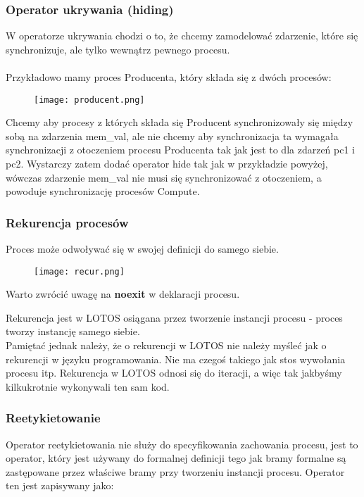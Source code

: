 \documentclass[a4paper,15pt]{article}
\newcommand{\example}[2]{
    \begin{tcolorbox}[colback=blue!5!white,colframe=blue,title={Przykład #1}]
        #2
    \end{tcolorbox}
}
\begin{document}
\newpage
\subsubsection{Operator ukrywania (hiding)}
W operatorze ukrywania chodzi o to, że chcemy zamodelować zdarzenie, które się synchronizuje, ale tylko wewnątrz pewnego procesu. \\ \\
Przykładowo mamy proces Producenta, który składa się z dwóch procesów:
\begin{figure}[H]
\centerline{\texttt{[image: producent.png]}}
\label{fig:producent}
\end{figure}

Chcemy aby procesy z których składa się Producent synchronizowały się między sobą na zdarzenia mem\_val, ale nie chcemy aby synchronizacja ta wymagała synchronizacji z otoczeniem procesu Producenta tak jak jest to dla zdarzeń pc1 i pc2. Wystarczy zatem dodać operator hide tak jak w przykładzie powyżej, wówczas zdarzenie mem\_val nie musi się synchronizować z otoczeniem, a powoduje synchronizację procesów Compute. 



\newpage
\subsubsection{Rekurencja procesów}
Proces może odwoływać się w swojej definicji do samego siebie. 
\example{}{
\begin{figure}[H]
\centerline{\texttt{[image: recur.png]}}
\label{fig:recur}
\end{figure}
Warto zwrócić uwagę na \textbf{noexit} w deklaracji procesu.
}

Rekurencja jest w LOTOS osiągana przez tworzenie instancji procesu - proces tworzy instancję samego siebie. \\


Pamiętać jednak należy, że o rekurencji w LOTOS nie należy myśleć jak o rekurencji w języku programowania. Nie ma czegoś takiego jak stos wywołania procesu itp. Rekurencja w LOTOS odnosi się do iteracji, a więc tak jakbyśmy kilkukrotnie wykonywali ten sam kod. 


\subsubsection{Reetykietowanie}

Operator reetykietowania nie służy do specyfikowania zachowania procesu, jest to operator, który jest używany do formalnej definicji tego jak bramy formalne są zastępowane przez właściwe bramy przy tworzeniu instancji procesu. Operator ten jest zapisywany jako:
\end{document}
